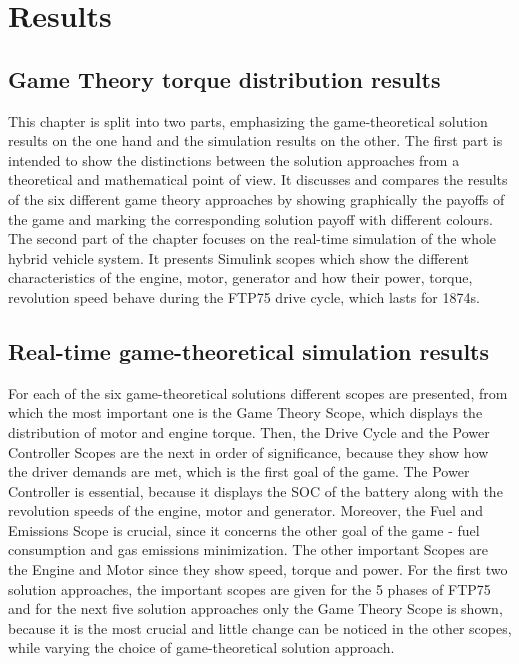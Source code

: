 \chapter{Results}
\label{chp:results}

\section{Game Theory torque distribution results}
This chapter is split into two parts, emphasizing the game-theoretical solution results on the one hand and the simulation results on the other. The first part is intended to show the distinctions between the solution approaches from a theoretical and mathematical point of view. It discusses and compares the results of the six different game theory approaches by showing graphically the payoffs of the game and marking the corresponding solution payoff with different colours. The second part of the chapter focuses on the real-time simulation of the whole hybrid vehicle system. It presents Simulink scopes which show the different characteristics of the engine, motor, generator and how their power, torque, revolution speed behave during the FTP75 drive cycle, which lasts for 1874s.

\section{Real-time game-theoretical simulation results}

For each of the six game-theoretical solutions different scopes are presented, from which the most important one is the Game Theory Scope, which displays the distribution of motor and engine torque. Then, the Drive Cycle and the Power Controller Scopes are the next in order of significance, because they show how the driver demands are met, which is the first goal of the game. The Power Controller is essential, because it displays the SOC of the battery along with the revolution speeds of the engine, motor and generator. Moreover, the Fuel and Emissions Scope is crucial, since it concerns the other goal of the game - fuel consumption and gas emissions minimization. The other important Scopes are the Engine and Motor since they show speed, torque and power. For the first two solution approaches, the important scopes are given for the 5 phases of FTP75 and for the next five solution approaches only the Game Theory Scope is shown, because it is the most crucial and little change can be noticed in the other scopes, while varying the choice of game-theoretical solution approach.

